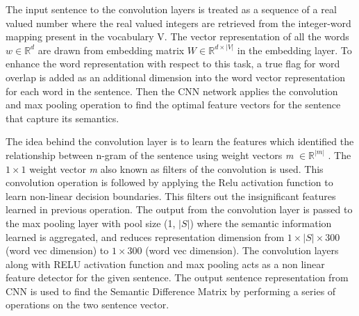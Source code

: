 \documentclass[12pt]{report} %
\begin{document}
	The input sentence to the convolution layers is treated as a sequence of a real valued number where the real valued integers are retrieved from the integer-word mapping present in the vocabulary V. The vector representation of all the words $ w \in \mathbb{R}^{d}  $ are drawn from embedding matrix  $ W \in \mathbb{R}^{d \times |V|} $ in the embedding layer. To enhance the word representation with respect to this task, a true flag for word overlap is added as an additional dimension into the word vector representation for each word in the sentence. Then the CNN network applies the convolution and max pooling operation to find the optimal feature vectors for the sentence that capture its semantics. 
	
	The idea behind the convolution layer is to learn the features which identified the relationship between n-gram of the sentence using weight vectors \textit{m} $\in \mathbb{R}^{|m|}$ . The $1 \times 1$ weight vector \textit{m} also known as filters of the convolution is used. This convolution operation is followed by applying the Relu activation function to learn non-linear decision boundaries. This filters out the insignificant features learned in previous operation. The output from the convolution layer is passed to the max pooling layer with pool size (1, $|S|$) where the semantic information learned is aggregated, and reduces representation dimension from $1 \times |S| \times 300$ (word vec dimension) to $1 \times 300$ (word vec dimension). The convolution layers along with RELU activation function and max pooling acts as a non linear  feature detector for the given sentence. The output sentence representation from CNN is used to find the Semantic Difference Matrix by performing a series of operations on the two sentence vector. 
	
\end{document}
